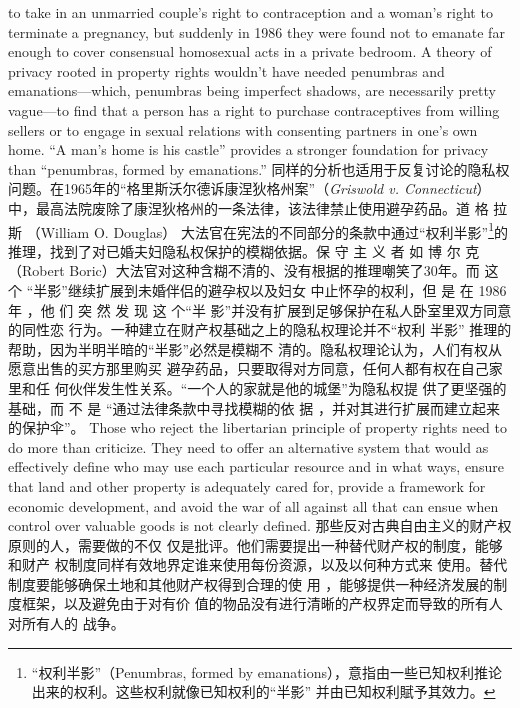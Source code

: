 \begin{paracol}{2}
to take in an unmarried couple's right to contraception and a
woman's right to terminate a pregnancy, but suddenly in 1986
they were found not to emanate far enough to cover consensual
homosexual acts in a private bedroom. A theory of privacy
rooted in property rights wouldn't have needed penumbras and
emanations---which, penumbras being imperfect shadows, are
necessarily pretty vague---to find that a person has a right to
purchase contraceptives from willing sellers or to engage in sexual relations with consenting partners in one's own home. ``A
man's home is his castle'' provides a stronger foundation for privacy than ``penumbras, formed by emanations.''
\switchcolumn
同样的分析也适用于反复讨论的隐私权问题。在1965年的“格里斯沃尔德诉康涅狄格州案”（\textit{Griswold v. Connecticut}）
中，最高法院废除了康涅狄格州的一条法律，该法律禁止使用避孕药品。道 格 拉 斯 （William  O. Douglas） 大法官在宪法的不同部分的条款中通过“权利半影”\footnote{“权利半影”（Penumbras, formed by emanations），意指由一些已知权利推论出来的权利。这些权利就像已知权利的“半影” 并由已知权利賦予其效力。}的推理，找到了对已婚夫妇隐私权保护的模糊依据。保 守 主 义 者 如 博 尔 克（Robert Boric）大法官对这种含糊不清的、没有根据的推理嘲笑了30年。而 这 个 “半影”继续扩展到未婚伴侣的避孕权以及妇女
中止怀孕的权利，但 是 在 1986年 ，他 们 突 然 发 现 这 个“半
影”并没有扩展到足够保护在私人卧室里双方同意的同性恋
行为。一种建立在财产权基础之上的隐私权理论并不“权利
半影” 推理的帮助，因为半明半暗的“半影”必然是模糊不
清的。隐私权理论认为，人们有权从愿意出售的买方那里购买
避孕药品，只要取得对方同意，任何人都有权在自己家里和任
何伙伴发生性关系。“一个人的家就是他的城堡”为隐私权提
供了更坚强的基础，而 不 是 “通过法律条款中寻找模糊的依
据 ，并对其进行扩展而建立起来的保护伞”。
\switchcolumn*
Those who reject the libertarian principle of property rights
need to do more than criticize. They need to offer an alternative
system that would as effectively define who may use each particular resource and in what ways, ensure that land and other
property is adequately cared for, provide a framework for economic development, and avoid the war of all against all that can
ensue when control over valuable goods is not clearly defined.
\switchcolumn
那些反对古典自由主义的财产权原则的人，需要做的不仅
仅是批评。他们需要提出一种替代财产权的制度，能够和财产
权制度同样有效地界定谁来使用每份资源，以及以何种方式来
使用。替代制度要能够确保土地和其他财产权得到合理的使
用 ，能够提供一种经济发展的制度框架，以及避免由于对有价
值的物品没有进行清晰的产权界定而导致的所有人对所有人的
战争。


\end{paracol}
